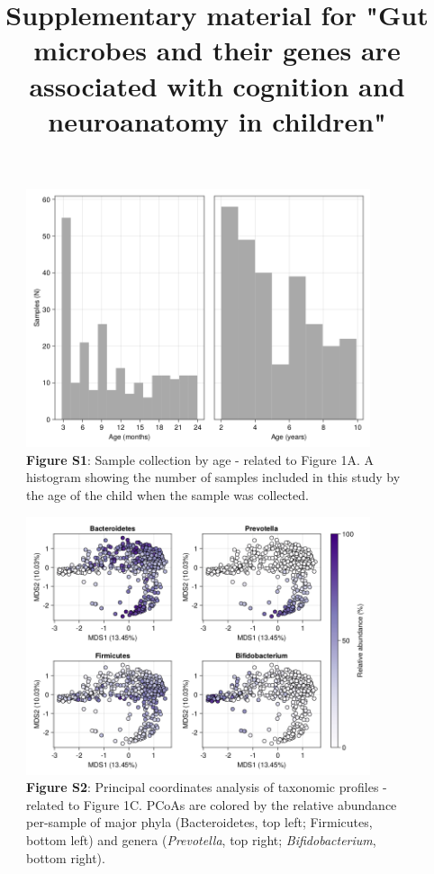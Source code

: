 \documentclass{article}
\title{Supplementary material for "Gut microbes and their genes are associated with cognition and neuroanatomy in children"}
\begin{document}
\baselineskip24pt

\maketitle

\begin{figure}[!htb]
    \centering
    \includegraphics[width=0.9\textwidth]{assets/Supp_Figure1.png}
    \captionsetup{labelformat=empty}
    \caption{
        \textbf{Figure S1}: Sample collection by age - related to Figure 1A. A histogram showing the number of samples
        included in this study by the age of the child when the sample was collected.
    }
\end{figure}

\begin{figure}[!htb]
    \centering
    \includegraphics[width=0.9\textwidth]{assets/Supp_Figure2.png}
    \captionsetup{labelformat=empty}
    \caption{
        \textbf{Figure S2}: Principal coordinates analysis of taxonomic profiles - 
        related to Figure 1C. PCoAs are colored by the relative abundance per-sample
        of major phyla (Bacteroidetes, top left; Firmicutes, bottom left)
        and genera (\textit{Prevotella}, top right; \textit{Bifidobacterium}, bottom right).
    }
\end{figure}
\end{document}
